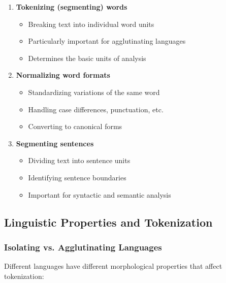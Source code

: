 \documentclass[11pt,a4paper]{article}
\theoremstyle{definition}
\theoremstyle{plain}
\theoremstyle{remark}
\begin{document}
\begin{enumerate}
    \item \textbf{Tokenizing (segmenting) words}
    \begin{itemize}
        \item Breaking text into individual word units
        \item Particularly important for agglutinating languages
        \item Determines the basic units of analysis
    \end{itemize}
    
    \item \textbf{Normalizing word formats}
    \begin{itemize}
        \item Standardizing variations of the same word
        \item Handling case differences, punctuation, etc.
        \item Converting to canonical forms
    \end{itemize}
    
    \item \textbf{Segmenting sentences}
    \begin{itemize}
        \item Dividing text into sentence units
        \item Identifying sentence boundaries
        \item Important for syntactic and semantic analysis
    \end{itemize}
\end{enumerate}

\subsection{Linguistic Properties and Tokenization}

\subsubsection{Isolating vs. Agglutinating Languages}

Different languages have different morphological properties that affect tokenization:
\end{document}
